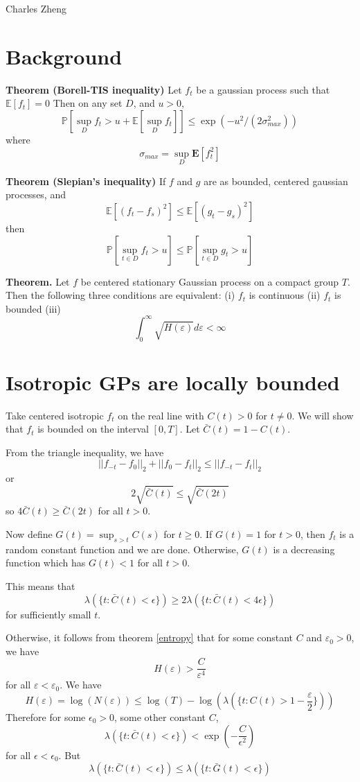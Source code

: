 \documentclass[11pt]{article}
\begin{document}
\newcommand{\tr}{\text{tr}}
\newcommand{\E}{\textbf{E}}
\newcommand{\diag}{\text{diag}}
\newcommand{\argmax}{\text{argmax}}
\newcommand{\Cov}{\text{Cov}}
\newcommand{\Var}{\text{Var}}

Charles Zheng

\section{Background}

\noindent\textbf{Theorem (Borell-TIS inequality)}
Let $f_t$ be a gaussian process such that $\mathbb{E}[f_t] = 0$
Then on any set $D$, and $u > 0$, 
\[
\mathbb{P}[\sup_D f_t > u + \mathbb{E}[\sup_D f_t]] \leq \exp(-u^2/(2\sigma_{max}^2))
\]
where
\[
\sigma_{max} = \sup_D \E[f_t^2]
\]

\noindent\textbf{Theorem (Slepian's inequality)}
If $f$ and $g$ are as bounded, centered gaussian processes, and
\[
\mathbb{E}[(f_t-f_s)^2] \leq \mathbb{E}[(g_t-g_s)^2]
\]
then
\[
\mathbb{P}[\sup_{t \in D} f_t  > u] \leq \mathbb{P}[\sup_{t \in D} g_t  > u]
\]

\noindent\textbf{Theorem.}\label{entropy} Let $f$ be centered stationary Gaussian
process on a compact group $T$. Then the following three conditions
are equivalent: (i) $f_t$ is continuous (ii) $f_t$ is bounded (iii)
\[
\int_0^\infty \sqrt{H(\varepsilon)} d\varepsilon < \infty 
\]

\section{Isotropic GPs are locally bounded}

Take centered isotropic $f_t$ on the real line with $C(t) > 0$ for $t
\neq 0$.  We will show that $f_t$ is bounded on the interval
$[0,T]$. Let $\bar{C}(t) = 1-C(t)$.

From the triangle inequality, we have
\[
||f_{-t}-f_0||_2 + ||f_0 - f_t||_2 \leq ||f_{-t}-f_{t}||_2
\]
or
\[
2\sqrt{\bar{C}(t)} \leq \sqrt{\bar{C}(2t)}
\]
so $4\bar{C}(t) \geq \bar{C}(2t)$ for all $t > 0$.

Now define $G(t) = \sup_{s > t} C(s)$ for $t \geq 0$.  If $G(t) = 1$
for $t > 0$, then $f_t$ is a random constant function and we are done.
Otherwise, $G(t)$ is a decreasing function which has $G(t) < 1$ for
all $t >0$.

This means that
\[
\lambda(\{t: \bar{C}(t) < \epsilon\}) \geq 2\lambda(\{t: \bar{C}(t) < 4\epsilon\})
\]
for sufficiently small $t$.


Otherwise, it follows from theorem \ref{entropy} that 
for some constant $C$ and $\varepsilon_0 > 0$, we have
\[
H(\varepsilon) > \frac{C}{\varepsilon^4}
\]
for all $\varepsilon < \varepsilon_0$.
We have
\[
H(\varepsilon) = \log(N(\varepsilon)) \leq \log(T) - \log(\lambda(\{t:
C(t) > 1-\frac{\varepsilon}{2}\}))
\]
Therefore for some $\epsilon_0 > 0$, some other constant $C$,
\[
\lambda(\{t: \bar{C}(t) < \epsilon\}) < \exp(-\frac{C}{\epsilon^2})
\]
for all $\epsilon < \epsilon_0$.
But
\[
\lambda(\{t: \bar{C}(t) < \epsilon\}) \leq \lambda(\{t: \bar{G}(t) < \epsilon\})
\]
\end{document}
